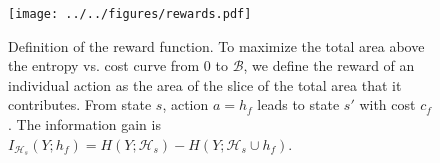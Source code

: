 \begin{figure}[ht]
\texttt{[image: ../../figures/rewards.pdf]}
\caption{
Definition of the reward function.
To maximize the total area above the entropy vs. cost curve from $0$ to $\mathcal{B}$, we define the reward of an individual action as the area of the slice of the total area that it contributes.
From state $s$, action $a = h_f$ leads to state $s'$ with cost $c_f$.
The information gain is $I_{\mathcal{H}_s}(Y; h_f) = H(Y; \mathcal{H}_s) - H(Y; \mathcal{H}_s \cup {h_f})$.
\label{fig:clf_rewards}}
\end{figure}
